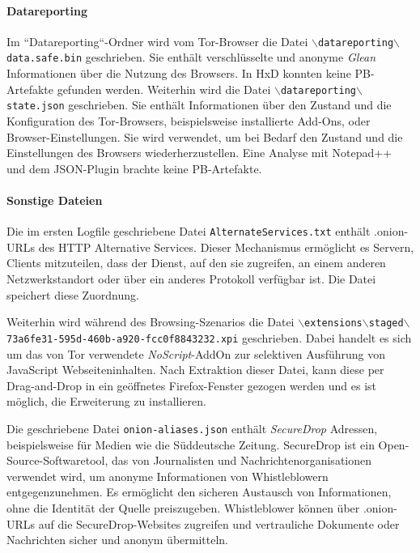 \begin{appendices}
\paragraph*{Datareporting}
Im ``Datareporting``-Ordner wird vom Tor-Browser die Datei \texttt{$\backslash$datareporting$\backslash$\\data.safe.bin} geschrieben. Sie enthält verschlüsselte und anonyme \textit{Glean} Informationen über die Nutzung des Browsers. \cite{GitHub.05.06.2023b}
In HxD konnten keine PB-Artefakte gefunden werden.
Weiterhin wird die Datei \texttt{$\backslash$datareporting$\backslash$state.json} geschrieben.
Sie enthält Informationen über den Zustand und die Konfiguration des Tor-Browsers, beispielsweise installierte Add-Ons, oder Browser-Einstellungen. Sie wird verwendet, um bei Bedarf den Zustand und die Einstellungen des Browsers wiederherzustellen. \cite{GitHub.08.04.2019}
Eine Analyse mit Notepad++ und dem JSON-Plugin brachte keine PB-Artefakte.

\paragraph*{Sonstige Dateien}
Die im ersten Logfile geschriebene Datei \texttt{AlternateServices.txt}
enthält .onion-URLs des HTTP Alternative Services. Dieser Mechanismus ermöglicht es Servern, Clients mitzuteilen, dass der Dienst, auf den sie zugreifen, an einem anderen Netzwerkstandort oder über ein anderes Protokoll verfügbar ist. Die Datei speichert diese Zuordnung. \cite{MozillaSupport.26.10.2020}

Weiterhin wird während des Browsing-Szenarios die Datei \texttt{$\backslash$extensions$\backslash$staged$\backslash${73a6fe31-595d-460b-a920-fcc0f8843232}.xpi} geschrieben. Dabei handelt es sich um das von Tor verwendete \textit{NoScript}-AddOn zur selektiven Ausführung von JavaScript Webseiteninhalten.
Nach Extraktion dieser Datei, kann diese per Drag-and-Drop in ein geöffnetes Firefox-Fenster gezogen werden und es ist möglich, die Erweiterung zu installieren.

Die geschriebene Datei \texttt{onion-aliases.json} enthält \textit{SecureDrop} Adressen, beispielsweise für Medien wie die Süddeutsche Zeitung. 
SecureDrop ist ein Open-Source-Softwaretool, das von Journalisten und Nachrichtenorganisationen verwendet wird, um anonyme Informationen von Whistleblowern entgegenzunehmen. Es ermöglicht den sicheren Austausch von Informationen, ohne die Identität der Quelle preiszugeben. Whistleblower können über .onion-URLs auf die SecureDrop-Websites zugreifen und vertrauliche Dokumente oder Nachrichten sicher und anonym übermitteln. \cite{SecureDrop.05.06.2023}


\end{appendices}
